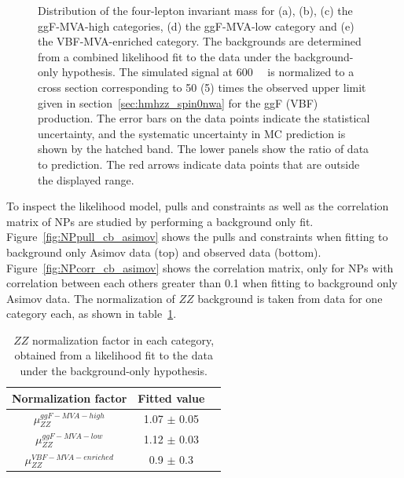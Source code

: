 \begin{figure}[!ht]
\begin{center}
    \caption{Distribution of the four-lepton invariant mass \mfl  
        for (a), (b), (c) the ggF-MVA-high categories, (d) the ggF-MVA-low category 
        and (e) the VBF-MVA-enriched category. 
    The backgrounds are determined from a combined likelihood fit to the data under the background-only 
    hypothesis. The simulated signal at 600~\gev~ is normalized to 
    a cross section corresponding to 50 (5) times the observed upper limit given in section~\ref{sec:hmhzz_spin0nwa}
    for the ggF (VBF) production.
    The error bars on the data points indicate the statistical uncertainty, 
    and the systematic uncertainty in MC prediction is shown by the hatched band. 
    The lower panels show the ratio of data to prediction.
    The red arrows indicate data points that are outside the displayed range.}   
  \label{fig:m4l_postfit} 
  \end{center}
\end{figure}


To inspect the likelihood model, pulls and constraints as well as the correlation matrix of NPs are studied by performing a background only fit.
Figure~\ref{fig:NPpull_cb_asimov} shows the pulls and constraints when fitting to background only Asimov data (top) and observed data (bottom).
Figure~\ref{fig:NPcorr_cb_asimov} shows the correlation matrix, only for NPs with correlation between each others greater than 0.1 when fitting to background only Asimov data.
The normalization of $ZZ$ background is taken from data for one category each, as shown in table~\ref{tab:muZZ_bonly_dnn}.

\begin{table}[htbp]
  \centering
  \caption{$ZZ$ normalization factor in each category, obtained from a likelihood fit to the data under the background-only hypothesis.}
  \label{tab:muZZ_bonly_dnn}
  \small
  \begin{spacing}{1.0}
  \begin{tabular}{ccc}
    \toprule
    Normalization factor  & Fitted value \\
    \midrule
    $\mu_{ZZ}^{ggF-MVA-high}$  & 1.07 $\pm$ 0.05 \\
    \hline
    $\mu_{ZZ}^{ggF-MVA-low}$   & 1.12 $\pm$ 0.03 \\
    \hline
    $\mu_{ZZ}^{VBF-MVA-enriched}$  & 0.9 $\pm$ 0.3 \\
    \bottomrule
  \end{tabular}
  \end{spacing}
\end{table}

